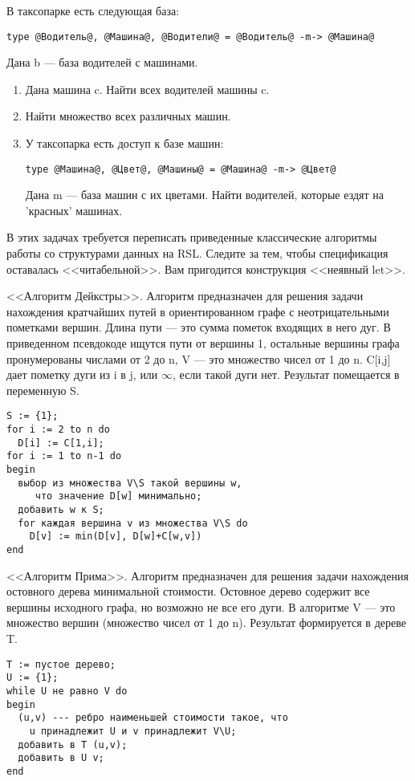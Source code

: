 \z В таксопарке есть следующая база:
\begin{lstlisting}[escapechar={@}]
type @Водитель@, @Машина@, @Водители@ = @Водитель@ -m-> @Машина@
\end{lstlisting}
Дана b --- база водителей с машинами.
\begin{enumerate}
  \item Дана машина c. Найти всех водителей машины c.
  \item Найти множество всех различных машин.
  \item У таксопарка есть доступ к базе машин:
\begin{lstlisting}[escapechar={@}]
type @Машина@, @Цвет@, @Машины@ = @Машина@ -m-> @Цвет@
\end{lstlisting}
Дана m --- база машин с их цветами. Найти водителей, которые ездят на 'красных' машинах.
\end{enumerate}



В этих задачах требуется переписать приведенные классические алгоритмы работы со структурами данных на RSL. Следите за тем, чтобы спецификация оставалась <<читабельной>>. Вам пригодится конструкция <<неявный let>>.

\z <<Алгоритм Дейкстры>>. Алгоритм предназначен для решения задачи нахождения кратчайших путей в ориентированном графе с неотрицательными пометками вершин. Длина пути --- это сумма пометок входящих в него дуг. В приведенном псевдокоде ищутся пути от вершины 1, остальные вершины графа пронумерованы числами от 2 до n, V --- это множество чисел от 1 до n. C[i,j] дает пометку дуги из i в j, или $\infty$, если такой дуги нет. Результат помещается в переменную S.

\begin{verbatim}
S := {1};
for i := 2 to n do
  D[i] := C[1,i];
for i := 1 to n-1 do
begin
  выбор из множества V\S такой вершины w,
     что значение D[w] минимально;
  добавить w к S;
  for каждая вершина v из множества V\S do
    D[v] := min(D[v], D[w]+C[w,v])
end
\end{verbatim}


\z <<Алгоритм Прима>>. Алгоритм предназначен для решения задачи нахождения остовного дерева минимальной стоимости. Остовное дерево содержит все вершины исходного графа, но возможно не все его дуги. В алгоритме V --- это множество вершин (множество чисел от 1 до n). Результат формируется в дереве T.

\begin{verbatim}
T := пустое дерево;
U := {1};
while U не равно V do
begin
  (u,v) --- ребро наименьшей стоимости такое, что
    u принадлежит U и v принадлежит V\U;
  добавить в T (u,v);
  добавить в U v;
end
\end{verbatim}





